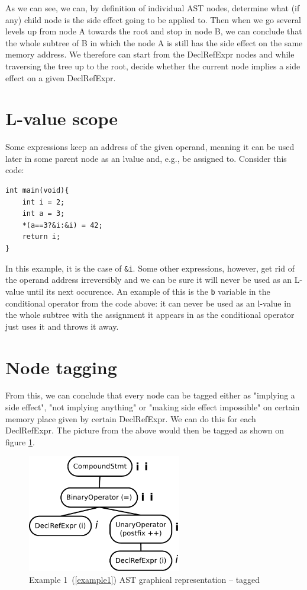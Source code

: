 As we can see, we can, by definition of individual AST nodes, determine what (if any) child node is the side effect going to be applied to. Then when we go several levels up from node A towards the root and stop in node B, we can conclude that the whole subtree of B in which the node A is still has the side effect on the same memory address. We therefore can start from the DeclRefExpr nodes and while traversing the tree up to the root, decide whether the current node implies a side effect on a given DeclRefExpr.

\section{L-value scope}
Some expressions keep an address of the given operand, meaning it can be used later in some parent node as an lvalue and, e.g., be assigned to. Consider this code:

\begin{lstlisting}
int main(void){
    int i = 2;
    int a = 3;
    *(a==3?&i:&i) = 42;
    return i;
}

\end{lstlisting}

In this example, it is the case of \verb|&i|. Some other expressions, however, get rid of the operand address irreversibly and we can be sure it will never be used as an L-value until its next occurence. An example of this is the \verb|b| variable in the conditional operator from the code above: it can never be used as an l-value in the whole subtree with the assignment it appears in as the conditional operator just uses it and throws it away.

\section{Node tagging}
From this, we can conclude that every node can be tagged either as "implying a side effect", "not implying anything" or "making side effect impossible" on certain memory place given by certain DeclRefExpr. We can do this for each DeclRefExpr. The picture from the above would then be tagged as shown on figure \ref{ASTtagged}.
\begin{figure}
    \caption{Example 1~(\ref{example1}) AST graphical representation -- tagged}
    \label{ASTtagged}
    \centering
        \includegraphics[width=0.6\textwidth]{fig/example1G-tagged.pdf}
\end{figure}

